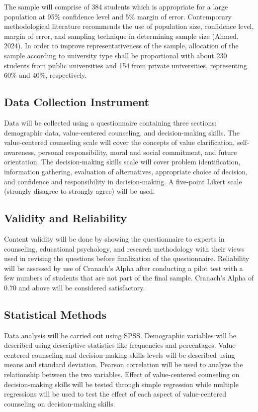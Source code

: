 \documentclass[10pt]{NSP1}
\begin{document}
The sample will comprise of 384 students which is appropriate for a large population at 95\% confidence level and 5\% margin of error. Contemporary methodological literature recommends the use of population size, confidence level, margin of error, and sampling technique in determining sample size (Ahmed, 2024). In order to improve representativeness of the sample, allocation of the sample according to university type shall be proportional with about 230 students from public universities and 154 from private universities, representing 60\% and 40\%, respectively.

\subsection{Data Collection Instrument}

Data will be collected using a questionnaire containing three sections: demographic data, value-centered counseling, and decision-making skills. The value-centered counseling scale will cover the concepts of value clarification, self-awareness, personal responsibility, moral and social commitment, and future orientation. The decision-making skills scale will cover problem identification, information gathering, evaluation of alternatives, appropriate choice of decision, and confidence and responsibility in decision-making. A five-point Likert scale (strongly disagree to strongly agree) will be used.

\subsection{Validity and Reliability}

Content validity will be done by showing the questionnaire to experts in counseling, educational psychology, and research methodology with their views used in revising the questions before finalization of the questionnaire. Reliability will be assessed by use of Cranach's Alpha after conducting a pilot test with a few numbers of students that are not part of the final sample. Cranach's Alpha of 0.70 and above will be considered satisfactory.

\subsection{Statistical Methods}

Data analysis will be carried out using SPSS. Demographic variables will be described using descriptive statistics like frequencies and percentages. Value-centered counseling and decision-making skills levels will be described using means and standard deviation. Pearson correlation will be used to analyze the relationship between the two variables. Effect of value-centered counseling on decision-making skills will be tested through simple regression while multiple regressions will be used to test the effect of each aspect of value-centered counseling on decision-making skills.
\end{document}
